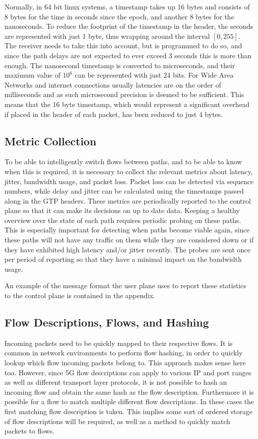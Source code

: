 Normally, in 64 bit linux systems, a timestamp takes up 16 bytes and consists of 8 bytes for the time in seconds since the epoch, and another 8 bytes for the nanoseconds. To reduce the footprint of the timestamp in the header, the seconds are represented with just 1 byte, thus wrapping around the interval $[0,255]$. The receiver needs to take this into account, but is programmed to do so, and since the path delays are not expected to ever exceed 3 seconds this is more than enough. The nanosecond timestamp is converted to microseconds, and their maximum value of $10^6$ can be represented with just 24 bits. For Wide Area Networks and internet connections usually latencies are on the order of milliseconds and as such microsecond precision is deemed to be sufficient. This means that the 16 byte timestamp, which would represent a significant overhead if placed in the header of each packet, has been reduced to just 4 bytes.

\subsection{Metric Collection}

To be able to intelligently switch flows between paths, and to be able to know when this is required, it is necessary to collect the relevant metrics about latency, jitter, bandwidth usage, and packet loss. Packet loss can be detected via sequence numbers, while delay and jitter can be calculated using the timestamps passed along in the GTP headers. These metrics are periodically reported to the control plane so that it can make its decisions on up to date data. Keeping a healthy overview over the state of each path requires periodic probing on these paths. This is especially important for detecting when paths become viable again, since these paths will not have any traffic on them while they are considered down or if they have exhibited high latency and/or jitter recently. The probes are sent once per period of reporting so that they have a minimal impact on the bandwidth usage.

An example of the message format the user plane uses to report these statistics to the control plane is contained in the appendix.

\subsection{Flow Descriptions, Flows, and Hashing}

Incoming packets need to be quickly mapped to their respective flows. It is common in network environments to perform flow hashing, in order to quickly lookup which flow incoming packets belong to. This approach makes sense here too. However, since 5G flow descriptions can apply to various IP and port ranges as well as different transport layer protocols, it is not possible to hash an incoming flow and obtain the same hash as the flow description. Furthermore it is possible for a flow to match multiple different flow descriptions. In these cases the first matching flow description is taken. This implies some sort of ordered storage of flow descriptions will be required, as well as a method to quickly match packets to flows.

